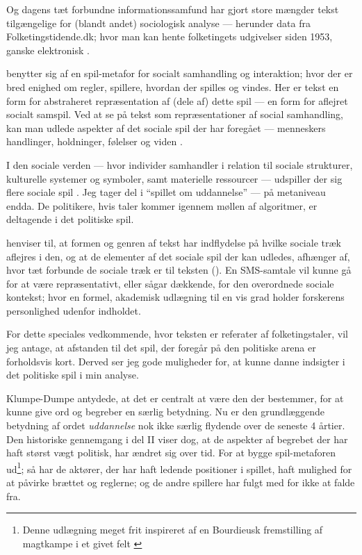 Og dagens tæt forbundne informationssamfund har gjort store mængder tekst tilgængelige for (blandt andet) sociologisk analyse --- herunder data fra Folketingstidende.dk; hvor man kan hente folketingets udgivelser siden 1953, ganske elektronisk \autocite{folketingstidendeOmFolketingstidende}.

\citeauthor{evansMachineTranslationMining2016} benytter sig af en spil-metafor for socialt samhandling og interaktion; hvor der er bred enighed om regler, spillere, hvordan der spilles og vindes.
Her er tekst en form for abstraheret repræsentation af (dele af) dette spil --- en form for aflejret socialt samspil.
Ved at se på tekst som repræsentationer af social samhandling, kan man udlede aspekter af det sociale spil der har foregået — menneskers handlinger, holdninger, følelser og viden \autocite[s. 22]{evansMachineTranslationMining2016}.

I den sociale verden — hvor individer samhandler i relation til sociale strukturer, kulturelle systemer og symboler, samt materielle ressourcer — udspiller der sig flere sociale spil \autocite[s. 23]{evansMachineTranslationMining2016}.
Jeg tager del i “spillet om uddannelse” --- på metaniveau endda.
De politikere, hvis taler kommer igennem møllen af algoritmer, er deltagende i det politiske spil.

\citeauthor{evansComputationSociologicalImagination2019} henviser til, at formen og genren af tekst har indflydelse på hvilke sociale træk aflejres i den, og at de elementer af det sociale spil der kan udledes, afhænger af, hvor tæt forbunde de sociale træk er til teksten (\citeyear[s. 23f]{evansMachineTranslationMining2016}). 
En SMS-samtale vil kunne gå for at være repræsentativt, eller sågar dækkende, for den overordnede sociale kontekst; hvor en formel, akademisk udlægning til en vis grad holder forskerens personlighed udenfor indholdet.

For dette speciales vedkommende, hvor teksten er referater af folketingstaler, vil jeg antage, at afstanden til det spil, der foregår på den politiske arena er forholdsvis kort.
Derved ser jeg gode muligheder for, at kunne danne indsigter i det politiske spil i min analyse.

Klumpe-Dumpe antydede, at det er centralt at være den der bestemmer, for at kunne give ord og begreber en særlig betydning.
Nu er den grundlæggende betydning af ordet \textit{uddannelse} nok ikke særlig flydende over de seneste 4 årtier.
Den historiske gennemgang i del II viser dog, at de aspekter af begrebet der har haft størst vægt politisk, har ændret sig over tid.
For at bygge spil-metaforen ud\footnote{Denne udlægning meget frit inspireret af en Bourdieusk fremstilling af magtkampe i et givet felt \autocite[kap.
1]{bourdieuFieldCulturalProduction2004}}; så har de aktører, der har haft ledende positioner i spillet, haft mulighed for at påvirke brættet og reglerne; og de andre spillere har fulgt med for ikke at falde fra.

